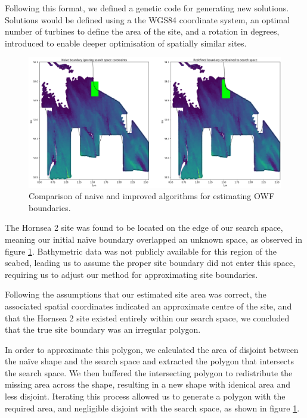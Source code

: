 \documentclass[preprint,12pt]{elsarticle}
\begin{document}
Following this format, we defined a genetic code for generating new solutions. Solutions would be defined using a the WGS84 coordinate system,  an optimal number of turbines to define the area of the site, and a rotation in degrees, introduced to enable deeper optimisation of spatially similar sites.

\begin{figure}[h!]
    \includegraphics[width=\textwidth,height=\textheight,keepaspectratio]{images/naive_versus_improved_owf_boundary_estimations.png}
    \caption{Comparison of naive and improved algorithms for estimating OWF boundaries.}
    \label{fig:naive_versus_improved_owf_boundary_estimations}
\end{figure}

\newpage
The Hornsea 2 site was found to be located on the edge of our search space, meaning our initial naïve boundary overlapped an unknown space, as observed in figure \ref{fig:naive_versus_improved_owf_boundary_estimations}. Bathymetric data was not publicly available for this region of the seabed, leading us to assume the proper site boundary did not enter this space, requiring us to adjust our method for approximating site boundaries.

Following the assumptions that our estimated site area was correct, the associated spatial coordinates indicated an approximate centre of the site, and that the Hornsea 2 site existed entirely within our search space, we concluded that the true site boundary was an irregular polygon.

In order to approximate this polygon, we calculated the area of disjoint between the naïve shape and the search space and extracted the polygon that intersects the search space. We then buffered the intersecting polygon to redistribute the missing area across the shape, resulting in a new shape with idenical area and less disjoint. Iterating this process allowed us to generate a polygon with the required area, and negligible disjoint with the search space, as shown in figure \ref{fig:naive_versus_improved_owf_boundary_estimations}.
\end{document}
